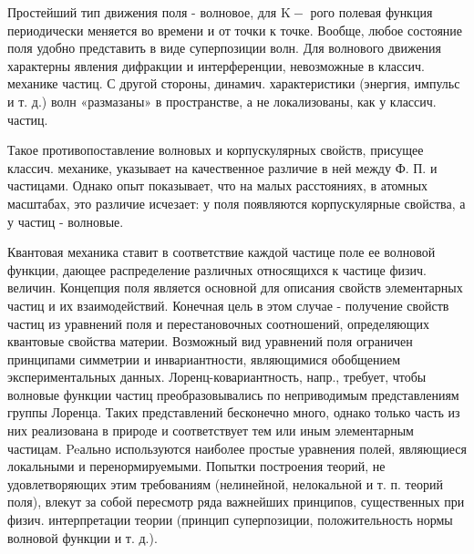 \documentclass[10pt]{article}
\begin{document}
Простейший тип движения поля - волновое, для $\mathrm{K}-$ рого полевая функция периодически меняется во времени и от точки к точке. Вообще, любое состояние поля удобно представить в виде суперпозиции волн. Для волнового движения характерны явления дифракции и интерференции, невозможные в классич. механике частиц. С другой стороны, динамич. характеристики (энергия, импульс и т. д.) волн «размазаны» в пространстве, а не локализованы, как у классич. частиц.



Такое противопоставление волновых и корпускулярных свойств, присущее классич. механике, указывает на качественное различие в ней между Ф. П. и частицами. Однако опыт показывает, что на малых расстояниях, в атомных масштабах, это различие исчезает: у поля появляются корпускулярные свойства, а у частиц - волновые.



Квантовая механика ставит в соответствие каждой частице поле ее волновой функции, дающее распределение различных относящихся к частице физич. величин. Концепция поля является основной для описания свойств элементарных частиц и их взаимодействий. Конечная цель в этом случае - получение свойств частиц из уравнений поля и перестановочных соотношений, определяющих квантовые свойства материи. Возможный вид уравнений поля ограничен принципами симметрии и инвариантности, являющимися обобщением экспериментальных данных. Лоренц-ковариантность, напр., требует, чтобы волновые функции частиц преобразовывались по неприводимым представлениям группы Лоренца. Таких представлений бесконечно много, однако только часть из них реализована в природе и соответствует тем или иным элементарным частицам. Peально используются наиболее простые уравнения полей, являющиеся локальными и перенормируемыми. Попытки построения теорий, не удовлетворяющих этим требованиям (нелинейной, нелокальной и т. п. теорий поля), влекут за собой пересмотр ряда важнейших принципов, существенных при физич. интерпретации теории (принцип суперпозиции, положительность нормы волновой функции и т. д.).
\end{document}
